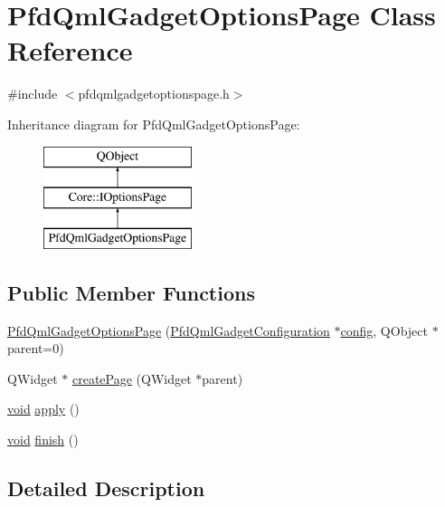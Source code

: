 \hypertarget{class_pfd_qml_gadget_options_page}{\section{Pfd\-Qml\-Gadget\-Options\-Page Class Reference}
\label{class_pfd_qml_gadget_options_page}
}


{\ttfamily \#include $<$pfdqmlgadgetoptionspage.\-h$>$}

Inheritance diagram for Pfd\-Qml\-Gadget\-Options\-Page\-:\begin{figure}[H]
\begin{center}
\leavevmode
\includegraphics[height=3.000000cm]{class_pfd_qml_gadget_options_page}
\end{center}
\end{figure}
\subsection*{Public Member Functions}
\begin{DoxyCompactItemize}
\item 
\hyperlink{class_pfd_qml_gadget_options_page_aa4d5aa5c42951b4b4c9a8afa08117b72}{Pfd\-Qml\-Gadget\-Options\-Page} (\hyperlink{class_pfd_qml_gadget_configuration}{Pfd\-Qml\-Gadget\-Configuration} $\ast$\hyperlink{deflate_8c_a4473b5227787415097004fd39f55185e}{config}, Q\-Object $\ast$parent=0)
\item 
Q\-Widget $\ast$ \hyperlink{class_pfd_qml_gadget_options_page_ae93296a6ba03258443fbf00c3a2bec21}{create\-Page} (Q\-Widget $\ast$parent)
\item 
\hyperlink{group___u_a_v_objects_plugin_ga444cf2ff3f0ecbe028adce838d373f5c}{void} \hyperlink{class_pfd_qml_gadget_options_page_a5bd6100058d1eadcba93dde902bf1013}{apply} ()
\item 
\hyperlink{group___u_a_v_objects_plugin_ga444cf2ff3f0ecbe028adce838d373f5c}{void} \hyperlink{class_pfd_qml_gadget_options_page_af1bb22d6d6f54295e1ae576da4f9f89d}{finish} ()
\end{DoxyCompactItemize}


\subsection{Detailed Description}


